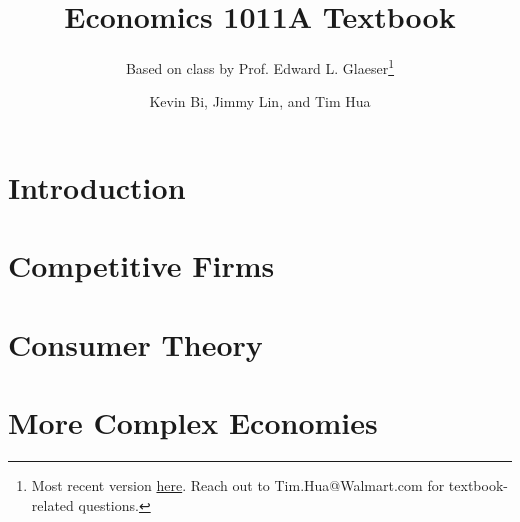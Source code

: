 \documentclass[12pt,twoside=false,openright,numbers=noenddot]{scrbook}
\title{Economics 1011A Textbook}
\subtitle{Based on class by Prof. Edward L. Glaeser\footnote{Most recent version \href{https://github.com/tim-hua-01/ECON-1011A-Textbook/blob/master/textbook.pdf}{here}. \newline Reach out to Tim.Hua@Walmart.com for textbook-related questions.} }
\author{Kevin Bi, Jimmy Lin, and Tim Hua}
\begin{document}
\maketitle
\tableofcontents

\part{Introduction}




\part{Competitive Firms}



\part{Consumer Theory}





\part{More Complex Economies}






\end{document}
